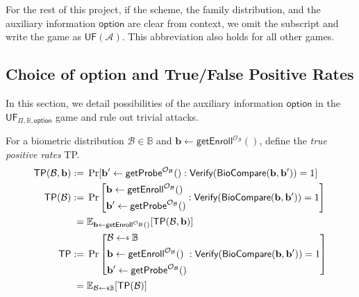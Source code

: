 For the rest of this project, if the scheme, the family distribution, and the auxiliary information $\textsf{option}$ are clear from context, we omit the subscript and write the game as $\textsf{UF}(\mathcal{A})$. This abbreviation also holds for all other games.




\subsection{Choice of \textsf{option} and True/False Positive Rates}
\label{sec:choice-of-option}

In this section, we detail possibilities of the auxiliary information $\textsf{option}$ in the $\textsf{UF}_{\Pi, \mathbb{B}, \textsf{option}}$ game and rule out trivial attacks.

For a biometric distribution $\mathcal{B} \in \mathbb{B}$ and $\mathbf{b} \gets \textsf{getEnroll}^{\mathcal{O}_\mathcal{B}}()$, define the \emph{true positive rates} \textsf{TP}.
\begin{align*}
	\textsf{TP}(\mathcal{B}, \mathbf{b}) 
	:=&\; \Pr[ \mathbf{b}^\prime \gets \textsf{getProbe}^{\mathcal{O}_\mathcal{B}}(): \textsf{Verify}(\textsf{BioCompare}(\mathbf{b}, \mathbf{b}^\prime )) = 1 ] \\
	\textsf{TP}(\mathcal{B}) 
	:=&\; \Pr \left[ 
		\begin{aligned}	
			& \mathbf{b} \gets \textsf{getEnroll}^{\mathcal{O}_\mathcal{B}}() \\
			& \mathbf{b}^\prime \gets \textsf{getProbe}^{\mathcal{O}_\mathcal{B}}()
		\end{aligned}
		: \textsf{Verify}(\textsf{BioCompare}(\mathbf{b}, \mathbf{b}^\prime)) = 1 \right] \\
	=&\; \mathbb{E}_{ \mathbf{b} \gets \textsf{getEnroll}^{\mathcal{O}_\mathcal{B}}() }[\textsf{TP}(\mathcal{B}, \mathbf{b})] \\
	\textsf{TP} 
	:=&\; \Pr \left[
		\begin{aligned}
			& \mathcal{B} \getsdollar \mathbb{B} \\
			& \mathbf{b} \gets \textsf{getEnroll}^{\mathcal{O}_\mathcal{B} }() \\
			& \mathbf{b}^\prime \gets \textsf{getProbe}^{\mathcal{O}_\mathcal{B} }()
		\end{aligned}
		: \textsf{Verify}(\textsf{BioCompare}(\mathbf{b}, \mathbf{b}^\prime )) = 1 \right] \\
	=&\; \mathbb{E}_{\mathcal{B} \getsdollar \mathbb{B}}[\textsf{TP}(\mathcal{B})] 
\end{align*}

